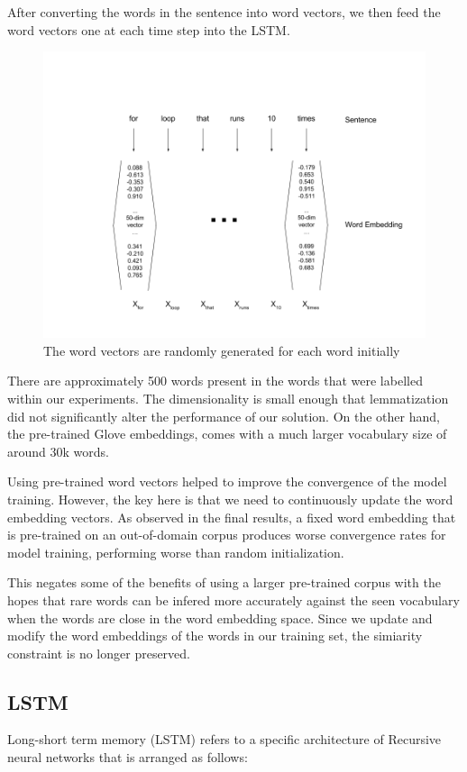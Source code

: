 \documentclass[fyp]{socreport}
\begin{document}
After converting the words in the sentence into word vectors, we then feed the
word vectors one at each time step into the LSTM.

\begin{figure}[h]
\includegraphics[width=\textwidth]{embedding.png}
\caption{The word vectors are randomly generated for each word initially}
\centering
\end{figure}

There are approximately 500 words present in the words that were labelled within
our experiments. The dimensionality is small enough that lemmatization did
not significantly alter the performance of our solution. On the other hand, the
pre-trained Glove embeddings, comes with a much larger vocabulary size of
around 30k words.

Using pre-trained word vectors helped to improve the convergence of the model
training. However, the key here is that we need to continuously update the
word embedding vectors. As observed in the final results, a fixed word embedding
that is pre-trained on an out-of-domain corpus produces worse convergence rates
for model training, performing worse than random initialization.

This negates some of the benefits of using a larger pre-trained corpus with the
hopes that rare words can be infered more accurately against the seen vocabulary
when the words are close in the word embedding space. Since we update and
modify the word embeddings of the words in our training set, the simiarity
constraint is no longer preserved.


\subsection{LSTM}
Long-short term memory (LSTM) refers to a specific architecture of Recursive
neural networks that is arranged as follows:
\end{document}
